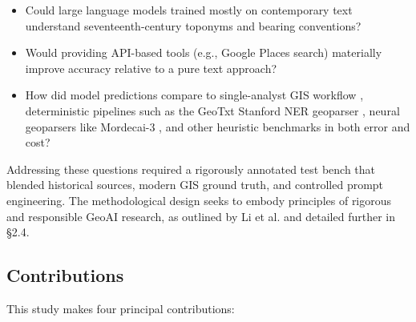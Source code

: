\begin{itemize}
\tightlist
\item
  Could large language models trained mostly on contemporary text
  understand seventeenth-century toponyms and bearing conventions?
\item
  Would providing API-based tools (e.g., Google Places search)
  materially improve accuracy relative to a pure text approach?
\item
  How did model predictions compare to single-analyst GIS workflow
  \citep{Bashorun2025_gis}, deterministic pipelines such as the GeoTxt
  Stanford NER geoparser \citep{karimzadeh2019geotxt}, neural geoparsers
  like Mordecai-3 \citep{halterman2023mordecai}, and other heuristic
  benchmarks in both error and cost?
\end{itemize}

Addressing these questions required a rigorously annotated test bench
that blended historical sources, modern GIS ground truth, and controlled
prompt engineering. The methodological design seeks to embody principles
of rigorous and responsible GeoAI research, as outlined by Li et al.
\citep{Li2024_geoai} and detailed further in §2.4.

\subsection{Contributions}\label{contributions}

This study makes four principal contributions:

